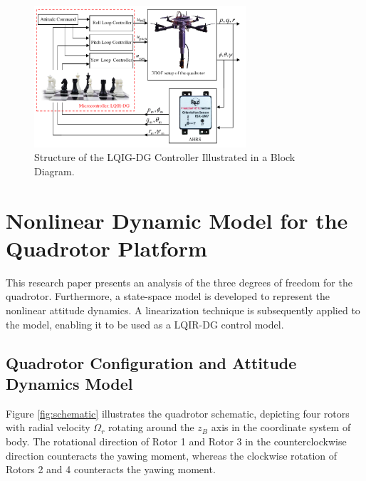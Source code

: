 \documentclass[3p,times]{elsarticle}
\begin{document}
\begin{figure}[H]
   \centering
   \includegraphics[width=0.7\textwidth]{../Figure/schematic.pdf}
   \caption{Structure of the LQIG-DG Controller Illustrated in a Block Diagram.}
   \label{fig:blockdiagram}
\end{figure}



\section{Nonlinear Dynamic Model for the Quadrotor Platform}\label{sec:modeling}
This research paper presents an analysis of the three degrees of freedom for the quadrotor. Furthermore, a state-space model is developed to represent the nonlinear attitude dynamics. A linearization technique is subsequently applied to the model, enabling it to be used as a LQIR-DG control model.
\subsection{Quadrotor Configuration and Attitude Dynamics Model}
Figure \ref{fig:schematic} illustrates the quadrotor schematic, depicting four rotors with radial velocity $\Omega_r$ rotating around the $z_B$ axis in the coordinate system of body. The rotational direction of Rotor 1 and Rotor 3 in the counterclockwise direction counteracts the yawing moment, whereas the clockwise rotation of Rotors 2 and 4 counteracts the yawing moment.
\end{document}
